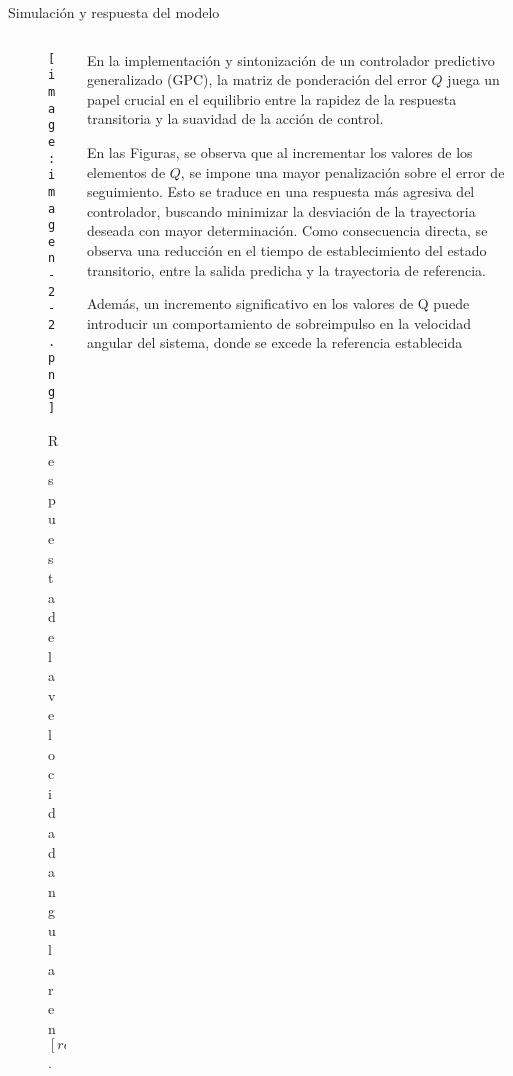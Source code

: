 \documentclass{beamer}
\begin{document}
\begin{frame}{Simulación y respuesta del modelo}
    \begin{columns}
        \begin{column}{0.45\textwidth}
            \begin{figure}
                \centering
                \texttt{[image: imagen-2-2.png]}
                \caption{Respuesta de la velocidad angular en $[rad/seg]$.}
                \label{fig:practico-1}
            \end{figure}
        \end{column}
        
        \begin{column}{0.5\textwidth}
            \scriptsize
            \begin{justify}
                En la implementación y sintonización de un controlador predictivo generalizado (GPC), la matriz de ponderación del error \( Q \) juega un papel crucial en el equilibrio entre la rapidez de la respuesta transitoria y la suavidad de la acción de control. 

                \vspace{0.2cm}
                En las Figuras, se observa que al incrementar los valores de los elementos de \( Q \), se impone una mayor penalización sobre el error de seguimiento. Esto se traduce en una respuesta más agresiva del controlador, buscando minimizar la desviación de la trayectoria deseada con mayor determinación. Como consecuencia directa, se observa una reducción en el tiempo de establecimiento del estado transitorio, entre la salida predicha y la trayectoria de referencia.

                \vspace{0.2cm}
                Además, un incremento significativo en los valores de Q puede introducir un comportamiento de sobreimpulso en la velocidad angular del sistema, donde se excede la referencia
establecida
            \end{justify}
        \end{column}
    \end{columns}
\end{frame}
\end{document}
